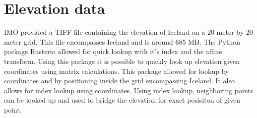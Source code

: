 \section{Elevation data}
IMO provided a TIFF file containing the elevation of Iceland on a 20 meter by 20 meter grid. This file encompasses Iceland and is around 685 MB. The Python package Rasterio allowed for quick lookup with it's index and the affine transform. Using this package it is possible to quickly look up elevation given coordinates using matrix calculations. This package allowed for lookup by coordinates and by positioning inside the grid encompassing Iceland. It also allows for index lookup using coordinates. Using index lookup, neighboring points can be looked up and used to bridge the elevation for exact posisiton of given point.